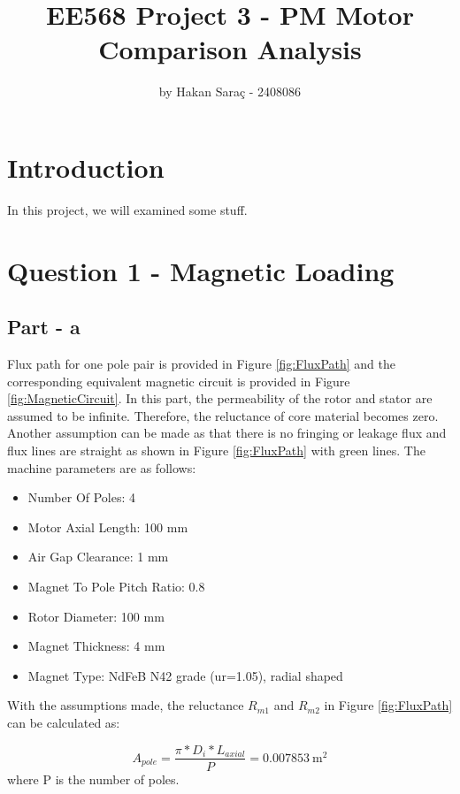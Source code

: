 \documentclass{article}
\title{EE568 Project 3 - PM Motor Comparison Analysis}
\author{by Hakan Saraç - 2408086}
\date{}
\begin{document}
\maketitle

\newpage
\section{Introduction}
In this project, we will examined some stuff.

\section{Question 1 - Magnetic Loading}
\subsection{Part - a}

Flux path for one pole pair is provided in Figure \ref{fig:FluxPath} and the corresponding equivalent magnetic circuit is provided in Figure \ref{fig:MagneticCircuit}. In this part, the permeability of the rotor and stator are assumed to be infinite. Therefore, the reluctance of core material becomes zero. Another assumption can be made as that there is no fringing or leakage flux and flux lines are straight as shown in Figure \ref{fig:FluxPath} with green lines. \newline
The machine parameters are as follows:
\begin{itemize}
    \item Number Of Poles: 4
    \item Motor Axial Length: 100 mm
    \item Air Gap Clearance: 1 mm
    \item Magnet To Pole Pitch Ratio: 0.8
    \item Rotor Diameter: 100 mm
    \item Magnet Thickness: 4 mm
    \item Magnet Type: NdFeB N42 grade (ur=1.05), radial shaped
\end{itemize} 
\bigskip
\noindent With the assumptions made, the reluctance $R_{m1}$ and $R_{m2}$ in Figure \ref{fig:FluxPath} can be calculated as:

\begin{equation} \label{eqn:PoleAreaFormula}
    A_{pole} = \frac{\pi*D_i*L_{axial}}{P}=0.007853 \: \mathrm{m^2}
\end{equation}
where P is the number of poles.

\bigskip
\end{document}
